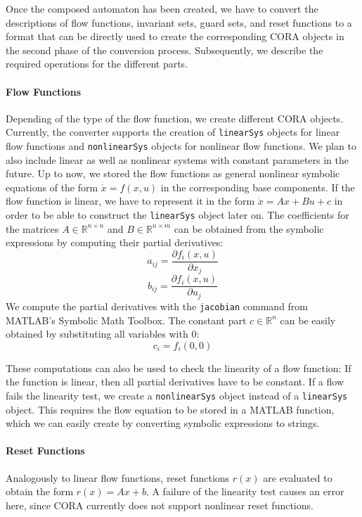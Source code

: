 Once the composed automaton has been created, we have to convert the descriptions of flow functions, invariant sets, guard sets, and reset functions to a format that can be directly used to create the corresponding CORA objects in the second phase of the conversion process. Subsequently, we describe the required operations for the different parts.

\paragraph{Flow Functions}

Depending of the type of the flow function, we create different CORA objects. Currently, the converter supports the creation of \texttt{linearSys} objects for linear flow functions and \texttt{nonlinearSys} objects for nonlinear flow functions. We plan to also include linear as well as nonlinear systems with constant parameters in the future. Up to now, we stored the flow functions as general nonlinear symbolic equations of the form $\dot x = f(x,u)$ in the corresponding base components. If the flow function is linear, we have to represent it in the form $\dot{x} = Ax + Bu + c$ in order to be able to construct the \texttt{linearSys} object later on.
The coefficients for the matrices $A\in\mathbb{R}^{n\times n}$ and $B\in\mathbb{R}^{n\times m}$ can be obtained from the symbolic expressions by computing their partial derivatives:
\[a_{ij} = \frac{\partial f_i(x,u)}{\partial x_j}\]
\[b_{ij} = \frac{\partial f_i(x,u)}{\partial u_j}\]
We compute the partial derivatives with the \texttt{jacobian} command from MATLAB's Symbolic Math Toolbox.
The constant part $c \in \mathbb{R}^n$ can be easily obtained by substituting all variables with $0$:
\[c_i = f_i(0,0)\]

These computations can also be used to check the linearity of a flow function: If the function is linear, then all partial derivatives have to be constant. 
If a flow fails the linearity test, we create a \texttt{nonlinearSys} object instead of a \texttt{linearSys} object.
This requires the flow equation to be stored in a MATLAB function, which we can easily create by converting symbolic expressions to strings.


\paragraph{Reset Functions}

Analogously to linear flow functions, reset functions $r(x)$ are evaluated to obtain the form $r(x) = Ax + b$.
A failure of the linearity test causes an error here, since CORA currently does not support nonlinear reset functions.



